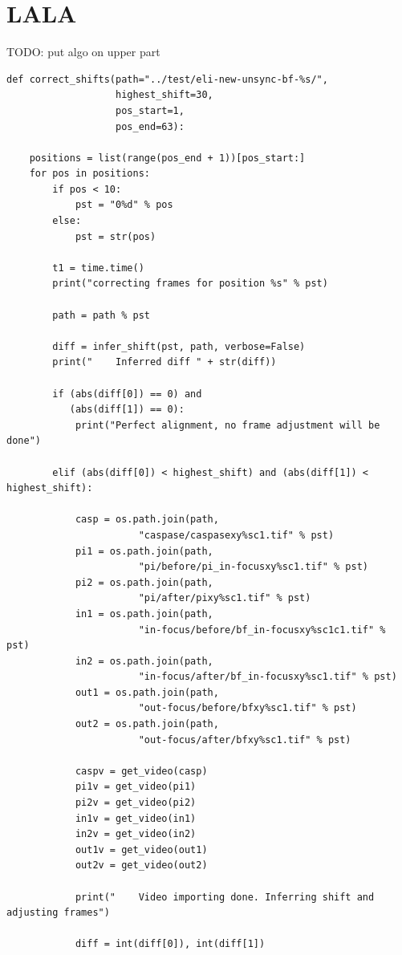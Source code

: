 \documentclass[pdftex,12pt,a4paper]{report}
\begin{document}
\section*{LALA}

TODO: put algo on upper part

\begin{verbatim}
def correct_shifts(path="../test/eli-new-unsync-bf-%s/",
                   highest_shift=30,
                   pos_start=1,
                   pos_end=63):

    positions = list(range(pos_end + 1))[pos_start:]
    for pos in positions:
        if pos < 10:
            pst = "0%d" % pos
        else:
            pst = str(pos)
        
        t1 = time.time()
        print("correcting frames for position %s" % pst)

        path = path % pst

        diff = infer_shift(pst, path, verbose=False)
        print("    Inferred diff " + str(diff))
    
        if (abs(diff[0]) == 0) and 
           (abs(diff[1]) == 0):
            print("Perfect alignment, no frame adjustment will be done")
    
        elif (abs(diff[0]) < highest_shift) and (abs(diff[1]) < highest_shift):

            casp = os.path.join(path, 
                       "caspase/caspasexy%sc1.tif" % pst)
            pi1 = os.path.join(path,
                       "pi/before/pi_in-focusxy%sc1.tif" % pst)
            pi2 = os.path.join(path,
                       "pi/after/pixy%sc1.tif" % pst)
            in1 = os.path.join(path,
                       "in-focus/before/bf_in-focusxy%sc1c1.tif" % pst)
            in2 = os.path.join(path,
                       "in-focus/after/bf_in-focusxy%sc1.tif" % pst)
            out1 = os.path.join(path,
                       "out-focus/before/bfxy%sc1.tif" % pst)
            out2 = os.path.join(path,
                       "out-focus/after/bfxy%sc1.tif" % pst)

            caspv = get_video(casp)
            pi1v = get_video(pi1)
            pi2v = get_video(pi2)
            in1v = get_video(in1)
            in2v = get_video(in2)
            out1v = get_video(out1)
            out2v = get_video(out2)

            print("    Video importing done. Inferring shift and adjusting frames")

            diff = int(diff[0]), int(diff[1])


\end{verbatim}
\end{document}
